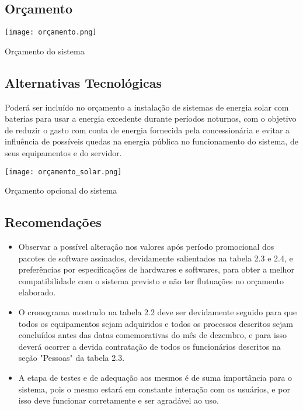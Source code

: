        \subsection{Or\c{c}amento }
             \begin{table}[H]
	    \begin{center}
	    \texttt{[image: orçamento.png]}
	    \caption{Orçamento do sistema} \label{tab:orca}
	    \end{center}
       \end{table} 

       \subsection{Alternativas Tecnol\'{o}gicas }
           Poderá ser incluído no orçamento a instalação de sistemas de energia solar com baterias para usar a energia excedente durante 		períodos noturnos, com o objetivo de reduzir o gasto com conta de energia fornecida pela concessionária e evitar a influência  de 	possíveis quedas na energia pública no funcionamento do sistema, de seus equipamentos e do servidor.	
	\begin{table}[H]
		    \begin{center}
		    \texttt{[image: orçamento\_solar.png]}
		    \caption{Orçamento opcional do sistema} \label{tab:orcaSol}
		    \end{center}
	\end{table} 
	


       \subsection{Recomenda\c{c}\~{o}es}
	\begin{itemize}
      \item Observar a possível alteração nos valores após período promocional dos pacotes de software assinados, devidamente salientados na tabela 2.3 e 2.4, e preferências por especificações de hardwares e softwares, para obter a melhor compatibilidade com o sistema previsto e não ter flutuações no orçamento elaborado. 
      \item O cronograma mostrado na tabela 2.2 deve ser devidamente seguido para que todos os equipamentos sejam adquiridos e todos os processos descritos sejam concluídos antes das datas comemorativas do mês de dezembro, e para isso deverá ocorrer a devida contratação de todos os funcionários descritos na seção "Pessoas" da tabela 2.3.
      \item A etapa de testes e de adequação aos mesmos é de suma importância para o sistema, pois o mesmo estará em constante interação com os usuários, e por isso deve funcionar corretamente e ser agradável ao uso.
	\end{itemize}

